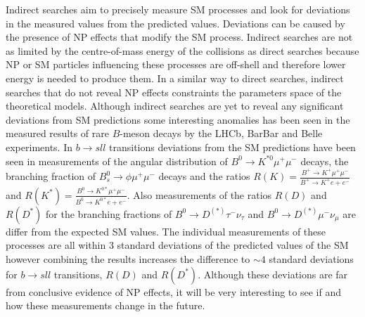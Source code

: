 Indirect searches aim to precisely measure SM processes and look for deviations in the measured values from the predicted values. Deviations can be caused by the presence of NP effects that modify the SM process. 
Indirect searches are not as limited by the centre-of-mass energy of the collisions as direct searches because NP or SM particles influencing these processes are off-shell and therefore lower energy is needed to produce them. In a similar way to direct searches, indirect searches that do not reveal NP effects constraints the parameters space of the theoretical models. Although indirect searches are yet to reveal any significant deviations from SM predictions some interesting anomalies has been seen in the measured results of rare $B$-meson decays by the LHCb, BarBar and Belle experiments. In $b \to sll$ transitions deviations from the SM predictions have been seen in measurements of the angular distribution of $B^0 \to K^{*0} \mu^{+} \mu^{-}$ decays, the branching fraction of $B^{0}_{s} \to \phi  \mu^{+} \mu^{-}$ decays and the ratios $R(K) = \frac{B^+ \to K^+ \mu^{+} \mu^{-}}{B^+ \to K^+ e{+} e^{-}}$ and $R(K^{*}) = \frac{B^0 \to K^{0*} \mu^{+} \mu^{-}}{B^0 \to K^{0*} e{+} e^{-}}$. Also measurements of the ratios $R(D)$ and $R(D^*)$ for the branching fractions of $B^0 \to D^{(*)} \tau^{-} \nu_{\tau}$ and $B^0 \to D^{(*)} \mu^{-} \nu_{\mu}$ are differ from the expected SM values. The individual measurements of these processes are all within 3 standard deviations of the predicted values of the SM however combining the results increases the difference to $\sim 4$ standard deviations for $b \to sll$ transitions, $R(D)$ and $R(D^*)$. Although these deviations are far from conclusive evidence of NP effects, it will be very interesting to see if and how these measurements change in the future.


